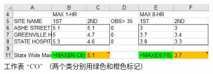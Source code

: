 \begin{figure}[tbp]
    \centering
    \includegraphics[width = .95\columnwidth]{figure/figure9.jpg}
    \caption{工作表 ``CO'' （两个类分别用绿色和橙色标记）}
    \label{figure9}
\end{figure}